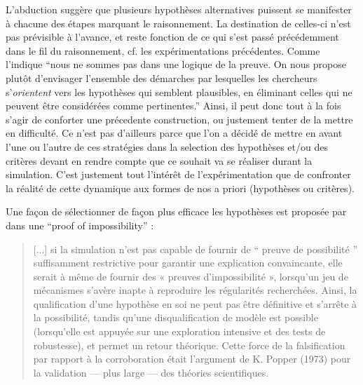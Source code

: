 


L'abduction suggère que plusieurs hypothèses alternatives puissent se manifester à chacune des étapes marquant le raisonnement. La destination de celles-ci n'est pas prévisible à l'avance, et reste fonction de ce qui s'est passé précédemment dans le fil du raisonnement, cf. les expérimentations précédentes. Comme l'indique \textcite{Besse2000} \enquote{nous ne sommes pas dans une logique de la preuve. On nous propose plutôt d'envisager l'ensemble des démarches par lesquelles les chercheurs s'\textit{orientent} vers les hypothèses qui semblent plausibles, en éliminant celles qui ne peuvent être considérées comme pertinentes.} Ainsi, il peut donc tout à la fois s'agir de conforter une précedente construction, ou justement tenter de la mettre en difficulté. Ce n'est pas d'ailleurs parce que l'on a décidé de mettre en avant l'une ou l'autre de ces stratégies dans la selection des hypothèses et/ou des critères devant en rendre compte que ce souhait va se réaliser durant la simulation. C'est justement tout l'intérêt de l'expérimentation que de confronter la réalité de cette dynamique aux formes de nos a priori (hypothèses ou critères).

Une façon de sélectionner de façon plus efficace les hypothèses est proposée par \textcite[300]{Cottineau2014b} dans une \foreignquote{english}{proof of impossibility} : 

\blockquote[{\cite[300]{Cottineau2014b}}]{[...] si la simulation n’est pas capable de fournir de \enquote{ preuve de possibilité } suffisamment restrictive pour garantir une explication convaincante, elle serait à même de fournir des « preuves d’impossibilité », lorsqu’un jeu de mécanismes s’avère inapte à reproduire les régularités recherchées. Ainsi, la qualification d’une hypothèse en soi ne peut pas être définitive et s’arrête à la possibilité, tandis qu’une disqualification de modèle est possible (lorsqu’elle est appuyée sur une exploration intensive et des tests de robustesse), et permet un retour théorique. Cette force de la falsification par rapport à la corroboration était l’argument de K. Popper (1973) pour la validation — plus large — des théories scientifiques.}

